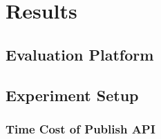 
\section{Results} %
\subsection{Evaluation Platform} %

%
%

\subsection{Experiment Setup} %
%
%

\subsubsection{Time Cost of Publish API} %
%




